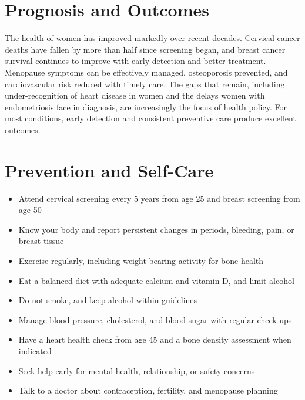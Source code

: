 \section*{Prognosis and Outcomes}
The health of women has improved markedly over recent decades. Cervical cancer deaths have fallen by more than half since screening began, and breast cancer survival continues to improve with early detection and better treatment. Menopause symptoms can be effectively managed, osteoporosis prevented, and cardiovascular risk reduced with timely care. The gaps that remain, including under-recognition of heart disease in women and the delays women with endometriosis face in diagnosis, are increasingly the focus of health policy. For most conditions, early detection and consistent preventive care produce excellent outcomes.

\section*{Prevention and Self-Care}
\begin{itemize}
    \item Attend cervical screening every 5 years from age 25 and breast screening from age 50
    \item Know your body and report persistent changes in periods, bleeding, pain, or breast tissue
    \item Exercise regularly, including weight-bearing activity for bone health
    \item Eat a balanced diet with adequate calcium and vitamin D, and limit alcohol
    \item Do not smoke, and keep alcohol within guidelines
    \item Manage blood pressure, cholesterol, and blood sugar with regular check-ups
    \item Have a heart health check from age 45 and a bone density assessment when indicated
    \item Seek help early for mental health, relationship, or safety concerns
    \item Talk to a doctor about contraception, fertility, and menopause planning
\end{itemize}

